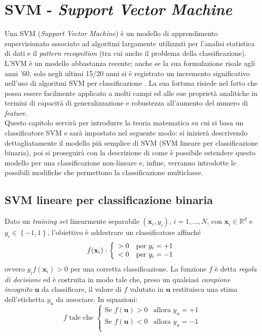 \chapter{SVM - \emph{Support Vector Machine}} %

\label{cap:svm} %

Una SVM (\emph{Support Vector Machine}) è un modello di apprendimento supervisionato associato ad algoritmi largamente utilizzati per l'analisi statistica di dati e il \emph{pattern recognition} (tra cui anche il problema della classificazione).
L'SVM è un modello abbastanza recente; anche se la sua formulazione risale agli anni '60, solo negli ultimi 15/20 anni si è registrato un incremento significativo nell'uso di algoritmi SVM per classificazione \citep{Book_svm}.
La sua fortuna risiede nel fatto che possa essere facilmente applicato a molti campi ed alle sue proprietà analitiche in termini di capacità di generalizzazione e robustezza all'aumento del numero di \emph{feature}.%
\\
Questo capitolo servirà per introdurre la teoria matematica su cui si basa un classificatore SVM e sarà impostato nel seguente modo: si inizierà descrivendo dettagliatamente il modello più semplice di SVM (SVM lineare per classificazione binaria), poi si proseguirà con la descrizione di come è possibile estendere questo modello per una classificazione non-lineare e, infine, verranno introdotte le possibili modifiche che permettono la classificazione multiclasse.
\clearpage

\section{SVM lineare per classificazione binaria}
Dato un \emph{training set} linearmente separabile $(\mathbf{x}_i,y_i)$, $i=1,\ldots,N$, con $\mathbf{x}_i\in\mathbb{R}^d$ e $y_i\in\left\lbrace -1,1\right\rbrace$, l'obiettivo è addestrare un classificatore affinché
\begin{equation}
\label{eq:SVM_lin_bin}
f(\mathbf{x}_i):\left\{ \begin{array}{ll} >0 & \mbox{per } y_i=+1 \\ < 0 & \mbox{per } y_i=-1 \end{array} \right.
\end{equation}
ovvero $y_if(\mathbf{x}_i)>0$ per una corretta classificazione.
La funzione $f$ è detta \textit{regola di decisione} ed è costruita in modo tale che, preso un qualsiasi \textit{campione incognito} $\mathbf{u}$ da classificare, il valore di $f$ valutato in $\mathbf{u}$ restituisca una stima dell'etichetta $y_u$ da associare. In equazioni:
\begin{equation}
\label{eq:regola_di_decisione}
f\text{ tale che }
\left\{
		\begin{array}{ll}
			\text{Se } f(\mathbf{u})>0 & \mbox{allora } y_u=+1 \\
			\text{Se } f(\mathbf{u})<0 & \mbox{allora } y_u=-1 \\
		\end{array}
	\right.
\end{equation}

